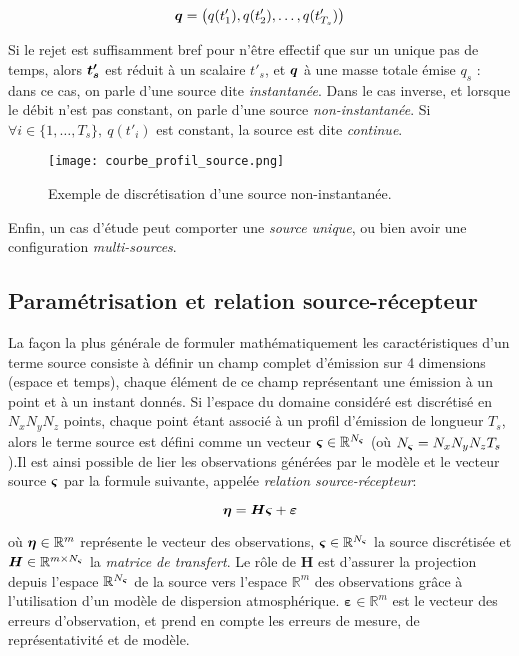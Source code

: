 	$$ {\bm{q}} = \left(q(t'_1), q(t'_2), \dots, q(t'_{T_s})\right)$$
	
	Si le rejet est suffisamment bref pour n'être effectif que sur un unique pas de temps, alors ${\bm{t'_s}}$ est réduit à un scalaire $t'_s$, et ${\bm{q}}$ à une masse totale émise $q_s$ : dans ce cas, on parle d'une source dite \textit{instantanée}. Dans le cas inverse, et lorsque le débit n'est pas constant, on parle d'une source \textit{non-instantanée}. Si $ \forall i \in \{1, \dots, T_s\}, ~ q(t'_i)$ est constant, la source est dite \textit{continue}. \\
	
	
	\begin{figure}[hb]
		\centering
		\texttt{[image: courbe\_profil\_source.png]}
		\caption{Exemple de discrétisation d'une source non-instantanée.}
		\label{fig_courbe_profil_source}
	\end{figure}
	
	Enfin, un cas d'étude peut comporter une \textit{source unique}, ou bien avoir une configuration \textit{multi-sources}.\\
	
	\subsection{Paramétrisation et relation source-récepteur}
	
	La façon la plus générale de formuler mathématiquement les caractéristiques d'un terme source consiste à définir un champ complet d'émission sur 4 dimensions (espace et temps), chaque élément de ce champ représentant une émission à un point et à un instant donnés. Si l'espace du domaine considéré est discrétisé en $N_xN_yN_z$ points, chaque point étant associé à un profil d'émission de longueur $T_s$, alors le terme source est défini comme un vecteur ${\bm{\varsigma}} \in \mathbb{R}^{N_{\bm{\varsigma}}}$ (où $N_{\bm{\varsigma}} = N_xN_yN_zT_s$).Il est ainsi possible de lier les observations générées par le modèle et le vecteur source ${\bm{\varsigma}}$ par la formule suivante, appelée \textit{relation source-récepteur}:
	
	\begin{equation}
		\label{eq_relation_SR_non_parametrique}
		{\bm{\eta}} = \bm{H}{\bm{\varsigma}} + \bm{\varepsilon}
	\end{equation}
	
	où ${\bm{\eta}} \in \mathbb{R}^m$ représente le vecteur des observations, ${\bm{\varsigma}} \in \mathbb{R}^{N_{\bm{\varsigma}}}$ la source discrétisée et $\bm{H} \in \mathbb{R}^{m \times N_{\bm{\varsigma}}}$  la \textit{matrice de transfert}. Le rôle de $\bm{H}$ est d'assurer la projection depuis l'espace $\mathbb{R}^{N_{\bm{\varsigma}}}$  de la source vers l'espace $\mathbb{R}^m$ des observations grâce à l'utilisation d'un modèle de dispersion atmosphérique. $\bm{\varepsilon} \in \mathbb{R}^m$ est le vecteur des erreurs d'observation, et prend en compte les erreurs de mesure, de représentativité et de modèle. \\
	
